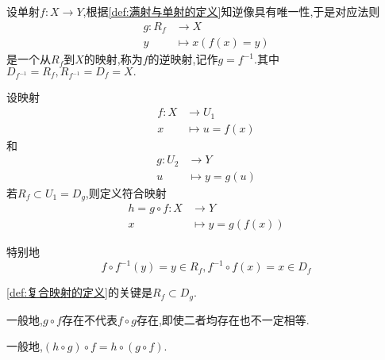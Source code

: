 \begin{formal}
    \begin{definition}[逆映射的定义]\label{def:逆映射的定义}
        设单射$f:X\longrightarrow Y$,根据\cref{def:满射与单射的定义}知逆像具有唯一性,于是对应法则\begin{align*}
        g:R_f&\longrightarrow X\\
        y&\longmapsto x(f\left(x\right)=y)
        \end{align*}是一个从$R_f$到$X$的映射,称为$f$的逆映射,记作$g=f^{-1}$.其中$D_{f^{-1}}=R_f,R_{f^{-1}}=D_f=X.$
    \end{definition}
\end{formal}
\begin{formal}
    \begin{definition}[复合映射的定义]\label{def:复合映射的定义}
        设映射\begin{align*}
            f:X&\longrightarrow U_1\\
            x&\longmapsto u=f\left( x \right)
        \end{align*}和\begin{align*}
            g:U_2&\longrightarrow Y\\
            u&\longmapsto y=g\left( u \right)
        \end{align*}若$R_f\subset U_1=D_g$,则定义符合映射\begin{align*}
            h=g\circ f:X&\longrightarrow Y\\
            x&\longmapsto y=g\left( f\left( x \right) \right)
        \end{align*}
    \end{definition}
\end{formal}
\begin{formal}
    \begin{theorem}[映射与逆映射复合]\label{thm:映射与逆映射复合}
        特别地\[
        f\circ f^{-1}\left(y\right)=y\in R_f,f^{-1}\circ f\left(x\right)=x\in D_f
        \]
    \end{theorem}
\end{formal}
\begin{red}
    \begin{remark}
        \cref{def:复合映射的定义}的关键是$R_f\subset D_g$.
    \end{remark}
\end{red}
\begin{red}
\begin{remark}
    一般地,$g\circ f$存在不代表$f\circ g$存在,即使二者均存在也不一定相等.
\end{remark}
\end{red}
\begin{formal}
    \begin{theorem}[符合映射结合律]\label{thm:符合映射结合律}
        一般地,$\left(h\circ g\right)\circ f=h\circ\left(g\circ f\right).$
    \end{theorem}
\end{formal}
